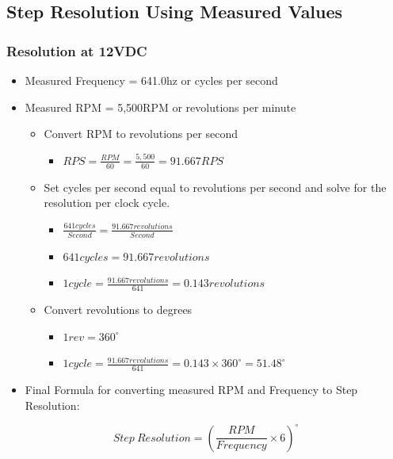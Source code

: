 \documentclass[main.tex]{subfiles}
\begin{document}
\subsection{Step Resolution Using Measured Values}

\subsubsection{Resolution at 12VDC}

\begin{itemize}
    \item [] Measured Frequency = 641.0hz or cycles per second
    \item [] Measured RPM = 5,500RPM or revolutions per minute
    \begin{itemize}
        \item [] Convert RPM to revolutions per second
        \begin{itemize}
            \item [] $RPS=\frac{RPM}{60}=\frac{5,500}{60}=91.667RPS$
        \end{itemize}
        \item[] Set cycles per second equal to revolutions per second and solve for the resolution per clock cycle. 
        \begin{itemize}
            \item [] $\frac{641cycles}{Second}= \frac{91.667revolutions}{Second}$
            \item[] $641cycles=91.667revolutions$
            \item[] $1cycle=\frac{91.667revolutions}{641}=0.143revolutions$
        \end{itemize}
        \item[] Convert revolutions to degrees
        \begin{itemize}
            \item [] $1rev=360^{\circ}$
            \item[] $1cycle=\frac{91.667revolutions}{641}=0.143\times 360^{\circ}=51.48^{\circ}$
        \end{itemize}
    \end{itemize}
    \item[] Final Formula for converting measured RPM and Frequency to Step Resolution:
\end{itemize}

    \begin{equation}
    Step \ Resolution  = \left(\frac{RPM}{Frequency}\times 6 \right)^{\circ} 
    \end{equation}
\end{document}
